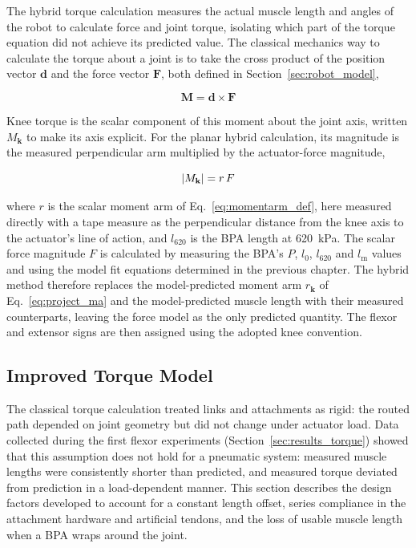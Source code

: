 The hybrid torque calculation measures the actual muscle length and angles of the robot to calculate force and joint torque, isolating which part of the torque equation did not achieve its predicted value. The classical mechanics way to calculate the torque about a joint is to take the cross product of the position vector $\mathbf{d}$ and the force vector $\mathbf{F}$, both defined in Section~\ref{sec:robot_model},

\begin{equation}
    \mathbf{M} = \mathbf{d} \times \mathbf{F} \label{eq:M_vec}
\end{equation}

Knee torque is the scalar component of this moment about the joint axis, written $M_{\mathbf{k}}$ to make its axis explicit. For the planar hybrid calculation, its magnitude is the measured perpendicular arm multiplied by the actuator-force magnitude,

\begin{equation}
    \lvert M_{\mathbf{k}}\rvert = r\,F \label{eq:M_scalar}
\end{equation}

where $r$ is the scalar moment arm of Eq.~\eqref{eq:momentarm_def}, here measured directly with a tape measure as the perpendicular distance from the knee axis to the actuator's line of action, and $l_{620}$ is the BPA length at \qty{620}{\kPa}. The scalar force magnitude $F$ is calculated by measuring the BPA's $P$, $l_{0}$, $l_{620}$ and $l_\text{m}$ values and using the model fit equations determined in the previous chapter. The hybrid method therefore replaces the model-predicted moment arm $r_{\mathbf{k}}$ of Eq.~\eqref{eq:project_ma} and the model-predicted muscle length with their measured counterparts, leaving the force model as the only predicted quantity. The flexor and extensor signs are then assigned using the adopted knee convention.

\subsection{Improved Torque Model}\label{sec:improved_model}

The classical torque calculation treated links and attachments as rigid: the routed path depended on joint geometry but did not change under actuator load. Data collected during the first flexor experiments (Section~\ref{sec:results_torque}) showed that this assumption does not hold for a pneumatic system: measured muscle lengths were consistently shorter than predicted, and measured torque deviated from prediction in a load-dependent manner. This section describes the design factors developed to account for a constant length offset, series compliance in the attachment hardware and artificial tendons, and the loss of usable muscle length when a BPA wraps around the joint.

